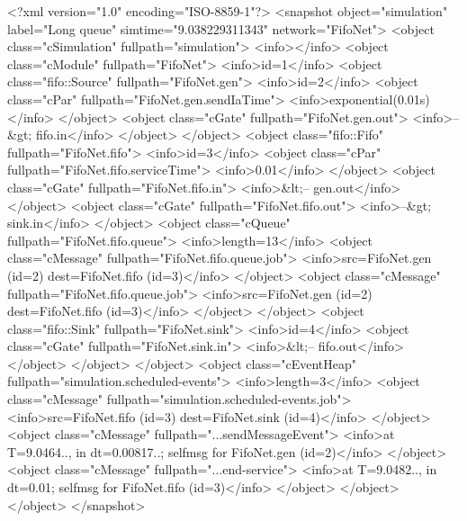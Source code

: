 \begin{xml}
<?xml version="1.0" encoding="ISO-8859-1"?>
<snapshot object="simulation" label="Long queue" simtime="9.038229311343"
network="FifoNet">
  <object class="cSimulation" fullpath="simulation">
    <info></info>
    <object class="cModule" fullpath="FifoNet">
      <info>id=1</info>
      <object class="fifo::Source" fullpath="FifoNet.gen">
        <info>id=2</info>
        <object class="cPar" fullpath="FifoNet.gen.sendIaTime">
          <info>exponential(0.01s)</info>
        </object>
        <object class="cGate" fullpath="FifoNet.gen.out">
          <info>--&gt; fifo.in</info>
        </object>
      </object>
      <object class="fifo::Fifo" fullpath="FifoNet.fifo">
        <info>id=3</info>
        <object class="cPar" fullpath="FifoNet.fifo.serviceTime">
          <info>0.01</info>
        </object>
        <object class="cGate" fullpath="FifoNet.fifo.in">
          <info>&lt;-- gen.out</info>
        </object>
        <object class="cGate" fullpath="FifoNet.fifo.out">
          <info>--&gt; sink.in</info>
        </object>
        <object class="cQueue" fullpath="FifoNet.fifo.queue">
          <info>length=13</info>
          <object class="cMessage" fullpath="FifoNet.fifo.queue.job">
            <info>src=FifoNet.gen (id=2)  dest=FifoNet.fifo (id=3)</info>
          </object>
          <object class="cMessage" fullpath="FifoNet.fifo.queue.job">
            <info>src=FifoNet.gen (id=2)  dest=FifoNet.fifo (id=3)</info>
          </object>
        </object>
      <object class="fifo::Sink" fullpath="FifoNet.sink">
        <info>id=4</info>
        <object class="cGate" fullpath="FifoNet.sink.in">
          <info>&lt;-- fifo.out</info>
        </object>
      </object>
    </object>
    <object class="cEventHeap" fullpath="simulation.scheduled-events">
      <info>length=3</info>
      <object class="cMessage" fullpath="simulation.scheduled-events.job">
        <info>src=FifoNet.fifo (id=3)  dest=FifoNet.sink (id=4)</info>
      </object>
      <object class="cMessage" fullpath="...sendMessageEvent">
        <info>at T=9.0464.., in dt=0.00817..; selfmsg for FifoNet.gen (id=2)</info>
      </object>
      <object class="cMessage" fullpath="...end-service">
        <info>at T=9.0482.., in dt=0.01; selfmsg for FifoNet.fifo (id=3)</info>
      </object>
    </object>
  </object>
</snapshot>

\end{xml}



